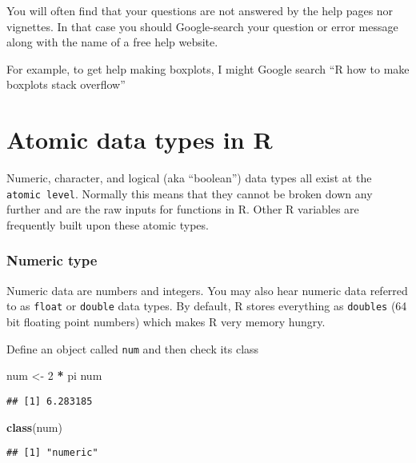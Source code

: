 \documentclass[]{article}
\newenvironment{Shaded}{\begin{snugshade}}{\end{snugshade}}
\newcommand{\KeywordTok}[1]{\textcolor[rgb]{0.13,0.29,0.53}{\textbf{#1}}}
\newcommand{\DecValTok}[1]{\textcolor[rgb]{0.00,0.00,0.81}{#1}}
\newcommand{\StringTok}[1]{\textcolor[rgb]{0.31,0.60,0.02}{#1}}
\newcommand{\OperatorTok}[1]{\textcolor[rgb]{0.81,0.36,0.00}{\textbf{#1}}}
\newcommand{\NormalTok}[1]{#1}
\begin{document}
You will often find that your questions are not answered by the help
pages nor vignettes. In that case you should Google-search your question
or error message along with the name of a free help website.

For example, to get help making boxplots, I might Google search ``R how
to make boxplots stack overflow''

\section{Atomic data types in R}\label{atomic-data-types-in-r}

Numeric, character, and logical (aka ``boolean'') data types all exist
at the \texttt{atomic\ level}. Normally this means that they cannot be
broken down any further and are the raw inputs for functions in R. Other
R variables are frequently built upon these atomic types.

\subsubsection{Numeric type}\label{numeric-type}

Numeric data are numbers and integers. You may also hear numeric data
referred to as \texttt{float} or \texttt{double} data types. By default,
R stores everything as \texttt{doubles} (64 bit floating point numbers)
which makes R very memory hungry.

Define an object called \texttt{num} and then check its class

\begin{Shaded}
\begin{Highlighting}[]
\NormalTok{num <-}\StringTok{ }\DecValTok{2} \OperatorTok{*}\StringTok{ }\NormalTok{pi}
\NormalTok{num}
\end{Highlighting}
\end{Shaded}

\begin{verbatim}
## [1] 6.283185
\end{verbatim}

\begin{Shaded}
\begin{Highlighting}[]
\KeywordTok{class}\NormalTok{(num)}
\end{Highlighting}
\end{Shaded}

\begin{verbatim}
## [1] "numeric"
\end{verbatim}
\end{document}
